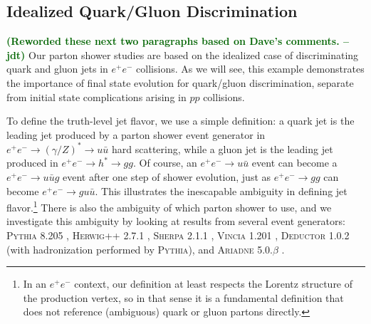 \documentclass[11pt]{cernrep}
\newcommand{\jdt}[1]{\textbf{\textcolor{darkgreen}{(#1 --jdt)}}}
\begin{document}
\subsection{Idealized Quark/Gluon Discrimination}
\label{quarkgluon_sec:ee}

\jdt{Reworded these next two paragraphs based on Dave's comments.}  Our parton shower studies are based on the idealized case of discriminating quark and gluon jets in $e^+ e^-$ collisions.  As we will see, this example demonstrates the importance of final state evolution for quark/gluon discrimination, separate from initial state complications arising in $pp$ collisions.  

To define the truth-level jet flavor, we use a simple definition:  a quark jet is the leading jet produced by a parton shower event generator in $e^+ e^- \to (\gamma/Z)^* \to u \bar{u}$ hard scattering, while a gluon jet is the leading jet produced in $e^+ e^- \to h^* \to gg$.  Of course, an $e^+e^- \to u \bar u$ event can become a $e^+e^- \to u \bar u g$ event after one step of shower evolution, just as $e^+e^- \to g g$ can become $e^+e^- \to g u \bar u$.  This illustrates the inescapable ambiguity in defining jet flavor.\footnote{In an $e^+e^-$ context, our definition at least respects the Lorentz structure of the production vertex, so in that sense it is a fundamental definition that does not reference (ambiguous) quark or gluon partons directly.}  There is also the ambiguity of which parton shower to use, and we investigate this ambiguity by looking at results from several event generators:  \textsc{Pythia 8.205} \cite{Sjostrand:2014zea}, \textsc{Herwig++ 2.7.1} \cite{Bellm:2013hwb}, \textsc{Sherpa 2.1.1} \cite{Gleisberg:2008ta}, \textsc{Vincia 1.201} \cite{Giele:2013ema}, \textsc{Deductor 1.0.2} \cite{Nagy:2014mqa} (with hadronization performed by \textsc{Pythia}), and \textsc{Ariadne 5.0.$\beta$} \cite{Flensburg:2011kk}.
\end{document}
